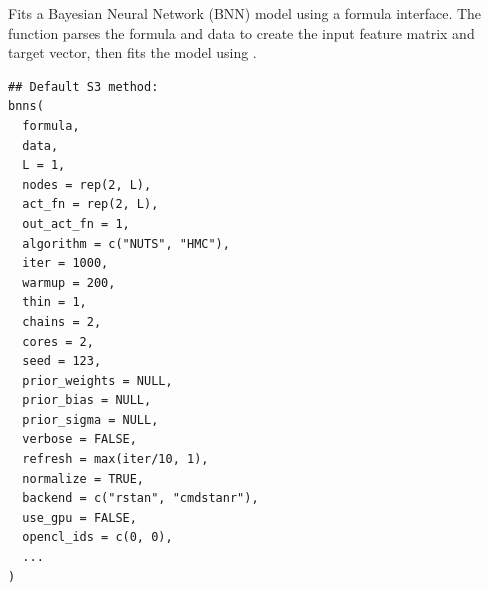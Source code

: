 \documentclass[a4paper]{book}
\begin{document}
%
\begin{Description}
Fits a Bayesian Neural Network (BNN) model using a formula interface. The function parses the formula and data to create the input feature matrix and target vector, then fits the model using .
\end{Description}
%
\begin{Usage}
\begin{verbatim}
## Default S3 method:
bnns(
  formula,
  data,
  L = 1,
  nodes = rep(2, L),
  act_fn = rep(2, L),
  out_act_fn = 1,
  algorithm = c("NUTS", "HMC"),
  iter = 1000,
  warmup = 200,
  thin = 1,
  chains = 2,
  cores = 2,
  seed = 123,
  prior_weights = NULL,
  prior_bias = NULL,
  prior_sigma = NULL,
  verbose = FALSE,
  refresh = max(iter/10, 1),
  normalize = TRUE,
  backend = c("rstan", "cmdstanr"),
  use_gpu = FALSE,
  opencl_ids = c(0, 0),
  ...
)
\end{verbatim}
\end{Usage}
%
\end{document}
